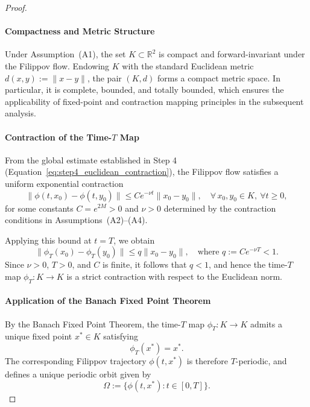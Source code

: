 \documentclass[11pt]{article}
\begin{document}
\begin{proof}
\paragraph{Compactness and Metric Structure}

Under Assumption~(A1), the set \( K \subset \mathbb{R}^2 \) is compact and forward-invariant under the Filippov flow. Endowing \( K \) with the standard Euclidean metric \( d(x, y) := \|x - y\| \), the pair \( (K, d) \) forms a compact metric space. In particular, it is complete, bounded, and totally bounded, which ensures the applicability of fixed-point and contraction mapping principles in the subsequent analysis.

\paragraph{Contraction of the Time-\(T\) Map}

From the global estimate established in Step 4 (Equation~\eqref{eq:step4_euclidean_contraction}), the Filippov flow satisfies a uniform exponential contraction
\begin{equation} \label{eq:phiT_flow_decay}
	\|\phi(t, x_0) - \phi(t, y_0)\| \leq C e^{-\nu t} \|x_0 - y_0\|, \quad \forall\, x_0, y_0 \in K,\ \forall t \geq 0,
\end{equation}
for some constants \( C = e^{2M} > 0 \) and \( \nu > 0 \) determined by the contraction conditions in Assumptions~(A2)--(A4).

Applying this bound at \( t = T \), we obtain
\begin{equation} \label{eq:phiT_contraction}
	\|\phi_T(x_0) - \phi_T(y_0)\| \leq q \|x_0 - y_0\|, \quad \text{where } q := C e^{-\nu T} < 1.
\end{equation}
Since \( \nu > 0 \), \( T > 0 \), and \( C \) is finite, it follows that \( q < 1 \), and hence the time-\(T\) map \( \phi_T \colon K \to K \) is a strict contraction with respect to the Euclidean norm.

\paragraph{Application of the Banach Fixed Point Theorem}

By the Banach Fixed Point Theorem, the time-\( T \) map \( \phi_T \colon K \to K \) admits a unique fixed point \( x^* \in K \) satisfying
\begin{equation} \label{eq:fixed_point}
	\phi_T(x^*) = x^*.
\end{equation}
The corresponding Filippov trajectory \( \phi(t, x^*) \) is therefore \( T \)-periodic, and defines a unique periodic orbit given by
\begin{equation} \label{eq:omega_def}
	\Omega := \{ \phi(t, x^*) : t \in [0, T] \}.
\end{equation}




\end{proof}
\end{document}
